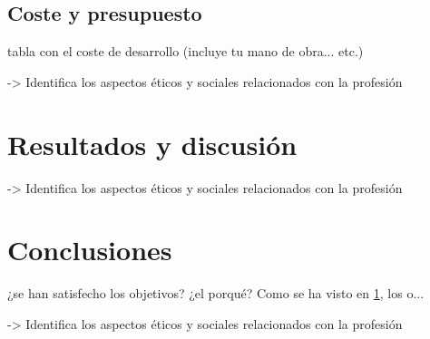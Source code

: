 \documentclass{article}
\begin{document}
 \subsection{Coste y presupuesto}
  
  tabla con el coste de desarrollo (incluye tu mano de obra... etc.)
  
->  Identifica los aspectos éticos y sociales relacionados con la profesión

 
\section{Resultados y discusión}\label{sec:ResultadosDisc}

-> Identifica los aspectos éticos y sociales relacionados con la profesión

\section{Conclusiones}

 ¿se han satisfecho los objetivos? ¿el porqué? Como se ha visto en \ref{sec:ResultadosDisc}, los o...
 
-> Identifica los aspectos éticos y sociales relacionados con la profesión




\end{document}
